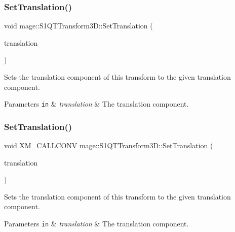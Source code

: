 \subsubsection{\texorpdfstring{Set\+Translation()}{SetTranslation()}\hspace{0.1cm}{\footnotesize\ttfamily [2/3]}}
{\footnotesize\ttfamily void mage\+::\+S1\+Q\+T\+Transform3\+D\+::\+Set\+Translation (\begin{DoxyParamCaption}\item[{\mbox{\hyperlink{namespacemage_a1e3c7a882af461f161caa1cbddaf1fa2}{F32x3}}}]{translation }\end{DoxyParamCaption})\hspace{0.3cm}{\ttfamily [noexcept]}}

Sets the translation component of this transform to the given translation component.


\begin{DoxyParams}[1]{Parameters}
\mbox{\tt in}  & {\em translation} & The translation component. \\
\hline
\end{DoxyParams}
\mbox{\label{classmage_1_1_s1_q_t_transform3_d_ab2f230e24a10933094f720c70ff54086}} 
\subsubsection{\texorpdfstring{Set\+Translation()}{SetTranslation()}\hspace{0.1cm}{\footnotesize\ttfamily [3/3]}}
{\footnotesize\ttfamily void X\+M\+\_\+\+C\+A\+L\+L\+C\+O\+NV mage\+::\+S1\+Q\+T\+Transform3\+D\+::\+Set\+Translation (\begin{DoxyParamCaption}\item[{F\+X\+M\+V\+E\+C\+T\+OR}]{translation }\end{DoxyParamCaption})\hspace{0.3cm}{\ttfamily [noexcept]}}

Sets the translation component of this transform to the given translation component.


\begin{DoxyParams}[1]{Parameters}
\mbox{\tt in}  & {\em translation} & The translation component. \\
\hline
\end{DoxyParams}
\mbox{\label{classmage_1_1_s1_q_t_transform3_d_ae4a30c6c1b96538754e0a89631a4872d}} 
